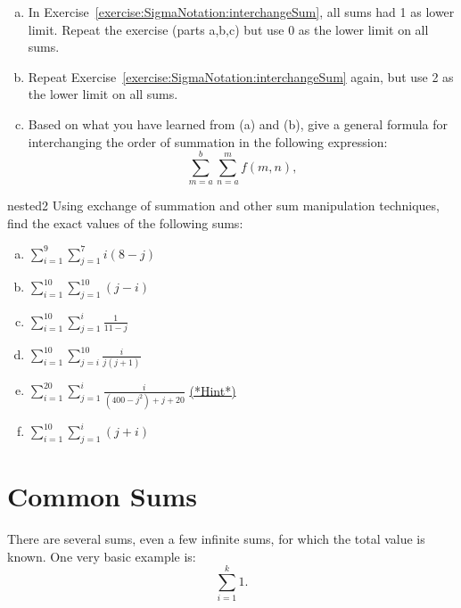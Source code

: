 \begin{exercise}{}
\begin{enumerate}[(a)]
\item
In Exercise~\ref{exercise:SigmaNotation:interchangeSum}, all sums had 1 as lower limit.  Repeat the exercise (parts a,b,c) but use 0 as the lower limit on all sums.
\item
Repeat Exercise~\ref{exercise:SigmaNotation:interchangeSum} again, but use 2 as the lower limit on all sums.
\item
Based on what you have learned from (a) and (b), give a general formula for interchanging the order of summation in the following expression:
\[
\sum_{m=a}^b \sum_{n=a}^m f(m,n),
\]
\end{enumerate}
\end{exercise}


\begin{exercise}{nested2}
Using exchange of summation and other sum manipulation techniques, find the exact values of the following sums:


\begin{multicols}{2}
\begin{enumerate}[(a)]
\item
$\displaystyle{\sum_{i=1}^{9} \sum_{j=1}^{7} i(8-j)}$
\item
$\displaystyle{\sum_{i=1}^{10} \sum_{j=1}^{10} (j-i)}$
\item
$\displaystyle{\sum_{i=1}^{10} \sum_{j=1}^i \frac{1}{11-j}}$
\item
$\displaystyle{\sum_{i=1}^{10} \sum_{j=i}^{10} \frac{i}{j(j+1)}}$
\item
$\displaystyle{\sum_{i=1}^{20} \sum_{j=1}^i \frac{i}{(400-j^2)+j+20}}$ \hyperref[sec:SigmaNotation:Hints]{(*Hint*)} 
\item
$\displaystyle{\sum_{i=1}^{10} \sum_{j=1}^i (j+i)}$
\end{enumerate}
\end{multicols}
\end{exercise}

\section{Common Sums\quad
{}}
\label{sec:SigmaNotation:CommonSums}

There are several sums, even a few infinite sums, for which the total value is known. One very basic example is:
\[\sum_{i=1}^{k}1.\]

